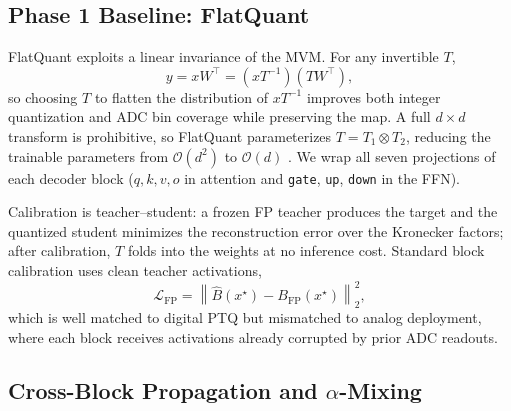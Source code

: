 \documentclass[letterpaper]{article} %
\theoremstyle{plain}
\begin{document}
\subsection{Phase 1 Baseline: FlatQuant}

FlatQuant exploits a linear invariance of the MVM. For any invertible $T$,
\begin{equation}
    y = xW^{\top} = (xT^{-1})(TW^{\top}),
    \label{eq:flatquant}
\end{equation}
so choosing $T$ to flatten the distribution of $xT^{-1}$ improves both integer quantization and ADC bin coverage while preserving the map. A full $d\times d$ transform is prohibitive, so FlatQuant parameterizes $T = T_1 \otimes T_2$, reducing the trainable parameters from $\mathcal{O}(d^2)$ to $\mathcal{O}(d)$ \citep{liu2024flatquant}. We wrap all seven projections of each decoder block ($q,k,v,o$ in attention and \texttt{gate}, \texttt{up}, \texttt{down} in the FFN).

Calibration is teacher--student: a frozen FP teacher produces the target and the quantized student minimizes the reconstruction error over the Kronecker factors; after calibration, $T$ folds into the weights at no inference cost. Standard block calibration uses clean teacher activations,
\begin{equation}
    \mathcal{L}_{\mathrm{FP}} = \left\| \hat{B}(x^{\star}) - B_{\mathrm{FP}}(x^{\star}) \right\|_2^2,
    \label{eq:lfp}
\end{equation}
which is well matched to digital PTQ but mismatched to analog deployment, where each block receives activations already corrupted by prior ADC readouts.

\subsection{Cross-Block Propagation and $\alpha$-Mixing}
\end{document}
